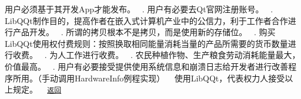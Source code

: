 
\begin{DoxyEnumerate}
\item 用户必须基于其开发\+App才能发布。 ~. 用户有必要去\+Qt官网注册账号。 ~. Lib\+Q\+Qt制作目的，提高作者在嵌入式计算机产业中的公信力，利于工作者合作进行产品开发。 ~. 所谓的拷贝根本不是拷贝，而是使用新的存储位。 ~. 购买\+Lib\+Q\+Qt使用权付费规则：按照换取相同能量消耗当量的产品所需要的货币数量进行收费。 ~. 为人工作进行收费。 ~. 农民种植作物、生产粮食劳动消耗能量最大，价值最高。 ~. 用户有必要接受提供使用系统信息和崩溃日志给开发者进行改善程序所用。（手动调用\+Hardware\+Info例程实现） ~\newline
 使用\+Lib\+Q\+Qt，代表权力人接受以上规定。 ~\newline
 \href{.}{\tt 返回} 
\end{DoxyEnumerate}